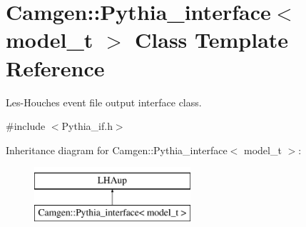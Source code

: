 \hypertarget{a00459}{}\section{Camgen\+:\+:Pythia\+\_\+interface$<$ model\+\_\+t $>$ Class Template Reference}
\label{a00459}


Les-\/\+Houches event file output interface class.  




{\ttfamily \#include $<$Pythia\+\_\+if.\+h$>$}

Inheritance diagram for Camgen\+:\+:Pythia\+\_\+interface$<$ model\+\_\+t $>$\+:\begin{figure}[H]
\begin{center}
\leavevmode
\includegraphics[height=2.000000cm]{a00459}
\end{center}
\end{figure}
